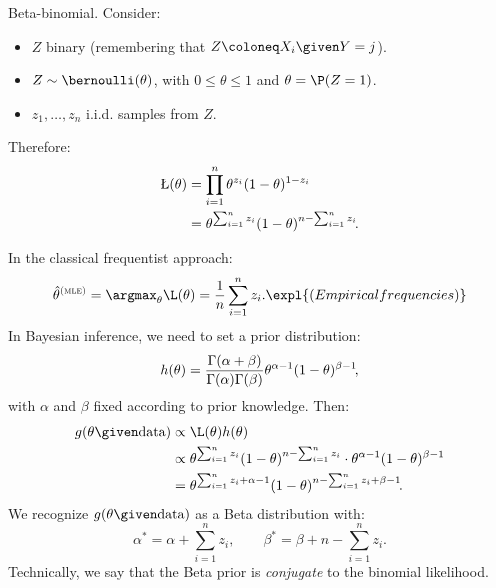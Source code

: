 \begin{example} Beta-binomial. Consider:
    \begin{itemize}[beginpenalty=10000]
        \item $Z$ binary (remembering that $Z \coloneq X_i \given Y = j$).
        \item $Z \sim \bernoulli(\theta)$, with $0 \leq \theta \leq 1$ and $\theta = \P(Z = 1)$.
        \item $z_1, \ldots, z_n$ i.i.d. samples from $Z$.
    \end{itemize}
    Therefore:
    \begin{equation}
        \begin{aligned}
            \L(\theta) & = \prod_{i = 1}^n \theta^{z_i}(1 - \theta)^{1 - z_i}                             \\
                       & = \theta^{\sum_{i = 1}^n z_i}(1 - \theta)^{n - \sum_{i = 1}^n z_i}\negthinspace.
        \end{aligned}
    \end{equation}

    In the classical frequentist approach:
    \begin{equation}
        \hat{\theta}^{\textsc{(mle)}} = \argmax_{\theta} \L(\theta) = \frac{1}{n}\sum_{i = 1}^n z_i. \expl{(Empirical frequencies)}
    \end{equation}
    In Bayesian inference, we need to set a prior distribution:
    \begin{equation}
        h(\theta) = \frac{\Gamma(\alpha + \beta)}{\Gamma(\alpha)\Gamma(\beta)}\theta^{\alpha - 1}(1 - \theta)^{\beta - 1}\negthinspace,
    \end{equation}
    with $\alpha$ and $\beta$ fixed according to prior knowledge. Then:
    \begin{equation}
        \begin{aligned}
            g(\theta \given \text{data}) & \propto \L(\theta)h(\theta)                                                                                         \\
                                         & \propto \theta^{\sum_{i = 1}^n z_i}(1 - \theta)^{n - \sum_{i = 1}^n z_i}\cdot \theta^{\alpha - 1}(1 - \theta)^{\beta - 1} \\
                                         & = \theta^{\sum_{i = 1}^n z_i + \alpha - 1}(1 - \theta)^{n - \sum_{i = 1}^n z_i + \beta - 1}\negthinspace.
        \end{aligned}
    \end{equation}
    We recognize $g(\theta\given \text{data})$ as a Beta distribution with:
    \begin{equation}
            \alpha^* = \alpha + \sum_{i = 1}^n z_i,\qquad\beta^* = \beta + n - \sum_{i = 1}^n z_i.
    \end{equation}
    Technically, we say that the Beta prior is \emph{conjugate} to the binomial likelihood.
\end{example}

